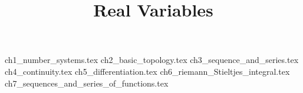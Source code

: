 \documentclass[]{report}
\title{Real Variables}
\begin{document}
\maketitle
{ch1_number_systems.tex}
{ch2_basic_topology.tex}
{ch3_sequence_and_series.tex}
{ch4_continuity.tex}
{ch5_differentiation.tex}
{ch6_riemann_Stieltjes_integral.tex}
{ch7_sequences_and_series_of_functions.tex}
\end{document}
